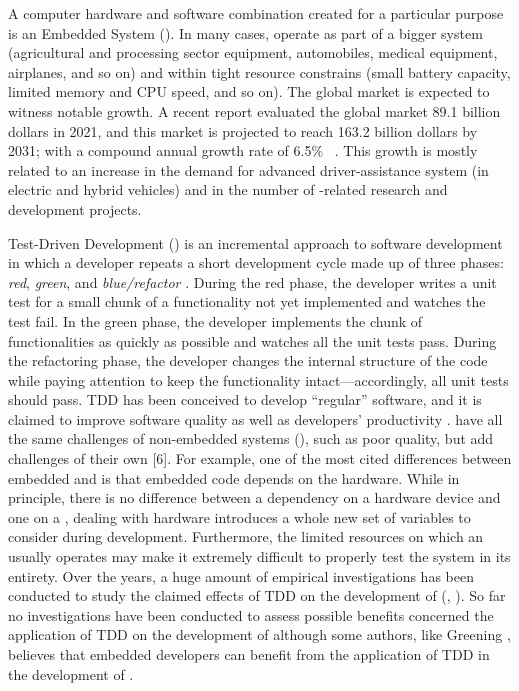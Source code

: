 A computer hardware and software combination created for a particular purpose is an Embedded System (\es). In many cases, \ess operate as part of a bigger system (\eg  agricultural and processing sector equipment, automobiles, medical equipment, airplanes, and so on) and within tight resource constrains (\eg small battery capacity, limited memory and CPU speed, and so on).
The global \ess market is expected to witness notable growth. A recent report evaluated the  global \ess market 89.1 billion dollars in 2021, and this market is projected to reach 163.2 billion dollars by 2031; with a compound annual growth rate of  6.5\%~ \cite{ESSTR2022}. This growth is mostly related to  an increase in the demand for advanced driver-assistance system (in electric and hybrid vehicles) and in the number of \ess-related research and development projects.  


Test-Driven Development (\tdd) is an incremental approach to software development in which a developer repeats a short development cycle made up of three phases: \textit{red}, \textit{green}, and \textit{blue/refactor} \cite{TDDByExample}. During the red phase, the developer writes a unit test for a small chunk of a functionality not yet implemented and watches the test fail. In the green phase, the developer implements the chunk of functionalities as quickly as possible and watches all the unit tests pass. During the refactoring phase, the developer changes the internal structure of the code while paying attention to keep the functionality intact—accordingly, all unit tests should pass. TDD has been conceived to develop “regular” software, and it is claimed to improve software quality as well as developers' productivity \cite{DBLP:reference/se/ErdogmusMJ10}. \ess have all the same challenges of non-embedded systems (\noess), such as poor quality, but add challenges of their own [6]. 
For example, one of the most cited differences between embedded and \noess is that embedded code depends on the hardware. While in principle, there is no difference between a dependency on a hardware device and one on a \noess \cite{TDDEC}, dealing with hardware introduces a whole new set of variables to consider during development. Furthermore, the limited resources on which an \es usually operates may make it extremely difficult to properly test the system in its entirety. 
Over the years, a huge amount of empirical investigations has been conducted to study the claimed effects of TDD on the development of \noess (\eg, \cite{DBLP:journals/software/KaracT18}). So far no investigations have been conducted to assess possible benefits concerned the application of TDD on the development of \ess although some authors, like Greening \cite{TDDEC}, believes that embedded developers can benefit from the application of TDD in the development of \ess.

